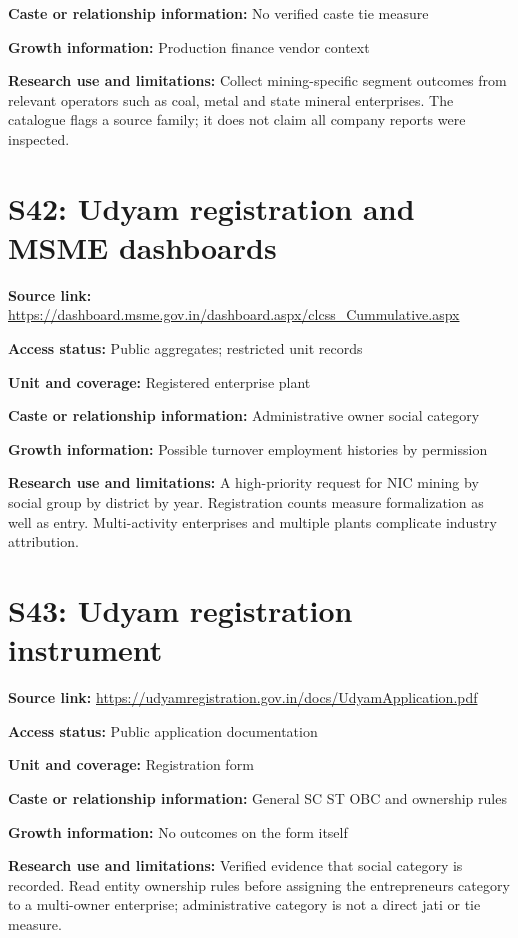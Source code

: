 \documentclass[11pt,a4paper]{report}
\begin{document}
\textbf{Caste or relationship information:} No verified caste tie measure

\textbf{Growth information:} Production finance vendor context

\textbf{Research use and limitations:} Collect mining-specific segment outcomes from relevant operators such as coal, metal and state mineral enterprises. The catalogue flags a source family; it does not claim all company reports were inspected.

\section{S42: Udyam registration and MSME dashboards}\hypertarget{S42}{}
\textbf{Source link:} \url{https://dashboard.msme.gov.in/dashboard.aspx/clcss_Cummulative.aspx}

\textbf{Access status:} Public aggregates; restricted unit records

\textbf{Unit and coverage:} Registered enterprise plant

\textbf{Caste or relationship information:} Administrative owner social category

\textbf{Growth information:} Possible turnover employment histories by permission

\textbf{Research use and limitations:} A high-priority request for NIC mining by social group by district by year. Registration counts measure formalization as well as entry. Multi-activity enterprises and multiple plants complicate industry attribution.

\section{S43: Udyam registration instrument}\hypertarget{S43}{}
\textbf{Source link:} \url{https://udyamregistration.gov.in/docs/UdyamApplication.pdf}

\textbf{Access status:} Public application documentation

\textbf{Unit and coverage:} Registration form

\textbf{Caste or relationship information:} General SC ST OBC and ownership rules

\textbf{Growth information:} No outcomes on the form itself

\textbf{Research use and limitations:} Verified evidence that social category is recorded. Read entity ownership rules before assigning the entrepreneurs category to a multi-owner enterprise; administrative category is not a direct jati or tie measure.
\end{document}
